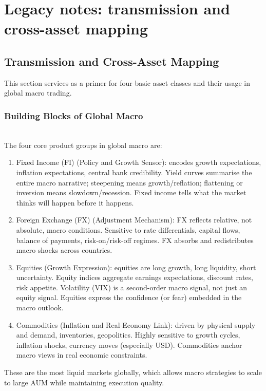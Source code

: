 \documentclass[a4paper,oneside,openany]{book}
\begin{document}
\chapter*{Legacy notes: transmission and cross-asset mapping}

\section{Transmission and Cross-Asset Mapping}

This section services as a primer for four basic asset classes and their usage in global macro trading.

\subsection*{Building Blocks of Global Macro}

\begin{remark} \\
The four core product groups in global macro are:
\begin{enumerate}[label=\roman*.]
\setlength{\itemsep}{0pt}
\item Fixed Income (FI) (Policy and Growth Sensor): encodes growth expectations, inflation expectations, central bank credibility. Yield curves summarise the entire macro narrative; steepening means growth/reflation; flattening or inversion means slowdown/recession. Fixed income tells what the market thinks will happen before it happens.
\item Foreign Exchange (FX) (Adjustment Mechanism): FX reflects relative, not absolute, macro conditions. Sensitive to rate differentials, capital flows, balance of payments, risk-on/risk-off regimes. FX absorbs and redistributes macro shocks across countries.
\item Equities (Growth Expression): equities are long growth, long liquidity, short uncertainty. Equity indices aggregate earnings expectations, discount rates, risk appetite. Volatility (VIX) is a second-order macro signal, not just an equity signal. Equities express the confidence (or fear) embedded in the macro outlook.
\item Commodities (Inflation and Real-Economy Link): driven by physical supply and demand, inventories, geopolitics. Highly sensitive to growth cycles, inflation shocks, currency moves (especially USD). Commodities anchor macro views in real economic constraints.
\end{enumerate}
These are the most liquid markets globally, which allows macro strategies to scale to large AUM while maintaining execution quality.
\end{remark}
\end{document}
